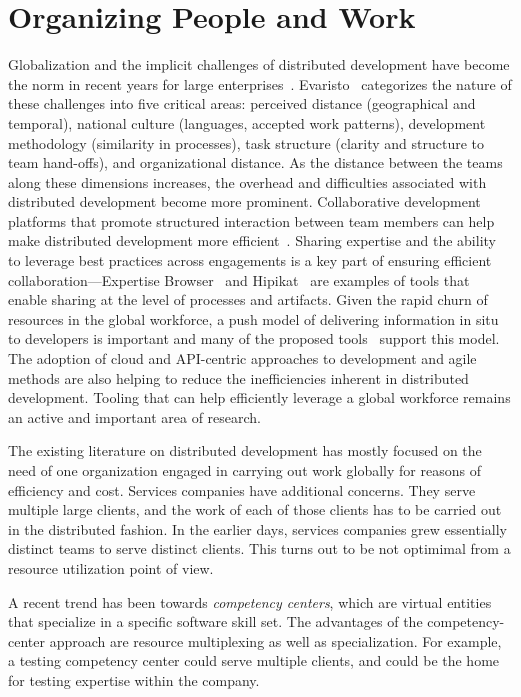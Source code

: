 \section{Organizing People and Work}
\label{sec:global}

Globalization and the implicit challenges of distributed development have become
the norm in recent years for large enterprises~\cite{glo24,glo26}.
Evaristo~\cite{glo27} categorizes the nature of these challenges into five
critical areas: perceived distance (geographical and temporal), national culture
(languages, accepted work patterns), development methodology (similarity in
processes), task structure (clarity and structure to team hand-offs), and
organizational distance. As the distance between the teams along these
dimensions increases, the overhead and difficulties associated with distributed
development become more prominent. Collaborative development platforms that
promote structured interaction between team members can help make distributed
development more efficient~\cite{glo28,glo29}. Sharing expertise and the ability
to leverage best practices across engagements is a key part of ensuring
efficient collaboration---Expertise Browser~\cite{glo30} and
Hipikat~\cite{glo31} are examples of tools that enable sharing at the level of
processes and artifacts. Given the rapid churn of resources in the global
workforce, a push model of delivering information in situ to developers is
important and many of the proposed tools~\cite{glo29,glo31} support this
model. The adoption of cloud and API-centric approaches to development and agile
methods are also helping to reduce the inefficiencies inherent in distributed
development. Tooling that can help efficiently leverage a global workforce
remains an active and important area of research.

The existing literature on distributed development has mostly focused on the
need of one organization engaged in carrying out work globally for reasons of
efficiency and cost.  Services companies have additional concerns.  They serve
multiple large clients, and the work of each of those clients has to be carried
out in the distributed fashion.  In the earlier days, services companies grew
essentially distinct teams to serve distinct clients.  This turns out to be not
optimimal from a resource utilization point of view.

A recent trend has been towards \textit{competency centers}, which are virtual
entities that specialize in a specific software skill set.  The advantages of
the competency-center approach are resource multiplexing as well as
specialization.  For example, a testing competency center could serve multiple
clients, and could be the home for testing expertise within the company.


